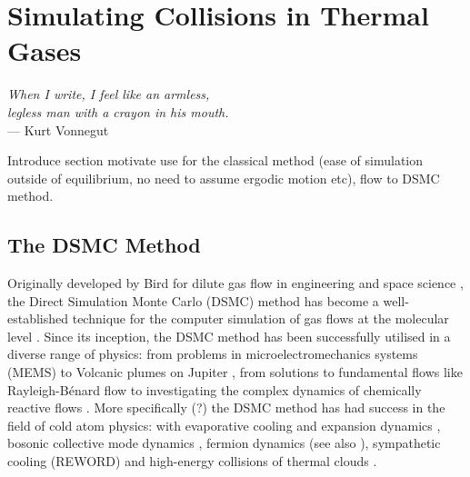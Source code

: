 
\chapter{Simulating Collisions in Thermal Gases} %

\label{ch:inhomogas} %


\begin{flushright}{\slshape    
When I write, I feel like an armless,\\
legless man with a crayon in his mouth.} \\ \medskip
--- Kurt Vonnegut
\end{flushright}

\bigskip


Introduce section motivate use for the classical method (ease of simulation outside of equilibrium, no need to assume ergodic motion etc), flow to DSMC method.


\section{The DSMC Method} \label{sec:dsmc}

Originally developed by Bird for dilute gas flow in engineering and space science \cite{Bird1963,Bird1976,Bird1994}, the Direct Simulation Monte Carlo (DSMC) method has become a well-established technique for the computer simulation of gas flows at the molecular level \cite{Bird2013}.
Since its inception, the DSMC method has been successfully utilised in a diverse range of physics: from problems in microelectromechanics systems (MEMS) \cite{Frangi2003} to Volcanic plumes on Jupiter \cite{Zhang2004}, from solutions to fundamental flows like Rayleigh-B\'enard flow \cite{Watanabe1994} to investigating the complex dynamics of chemically reactive flows \cite{Anderson2003,Goldsworthy2014}.
More specifically (?) the DSMC method has had success in the field of cold atom physics: with evaporative cooling and expansion dynamics \cite{Wu1996, Wu1997, Wu1998}, bosonic collective mode dynamics \cite{Jackson2001, Jackson2001b, Jackson2002, Jackson2002b, Jackson2002c}, fermion dynamics \cite{Urban2006, Urban2007, Urban2008, Lepers2010} (see also \cite{Vignolo2002, Toschi2003, Capuzzi2004, Toschi2004}), sympathetic cooling \cite{Barletta2010, Barletta2011} (REWORD) and high-energy collisions of thermal clouds \cite{Wade2011}.

